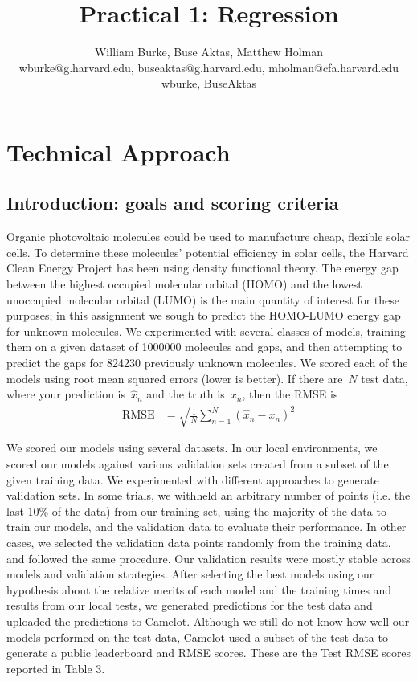 \documentclass[11pt]{article}
\title{Practical 1: Regression}
\author{William Burke, Buse Aktas, Matthew Holman \\ wburke@g.harvard.edu, buseaktas@g.harvard.edu, mholman@cfa.harvard.edu \\
wburke, BuseAktas}
\begin{document}
\maketitle{}
\section{Technical Approach}
\subsection {Introduction: goals and scoring criteria}
Organic photovoltaic molecules could be used to manufacture cheap, flexible solar cells. To determine these molecules' potential efficiency in solar cells, the Harvard Clean Energy Project has been using density functional theory. The energy gap between the highest occupied molecular orbital (HOMO) and the lowest unoccupied molecular orbital (LUMO) is the main quantity of interest for these purposes; in this assignment we sough to predict the HOMO-LUMO energy gap for unknown molecules. We experimented with several classes of models, training them on a given dataset of 1000000 molecules and gaps, and then attempting to predict the gaps for 824230 previously unknown molecules. We scored each of the models using root mean squared errors (lower is better).  If there are~$N$ test data, where your prediction is~$\hat{x}_n$ and the truth is~$x_n$, then the RMSE is 
	\begin{align*}
		\text{RMSE} &= \sqrt{\frac{1}{N}\sum_{n=1}^N (\hat{x}_n-x_n)^2}
	\end{align*}

We scored our models using several datasets. In our local environments, we scored our models against various validation sets created from a subset of the given training data. We experimented with different approaches to generate validation sets. In some trials, we withheld an arbitrary number of points (i.e. the last 10\% of the data) from our training set, using the majority of the data to train our models, and the validation data to evaluate their performance. In other cases, we selected the validation data points randomly from the training data, and followed the same procedure. Our validation results were mostly stable across models and validation strategies. After selecting the best models using our hypothesis about the relative merits of each model and the training times and results from our local tests, we generated predictions for the test data and uploaded the predictions to Camelot. Although we still do not know how well our models performed on the test data, Camelot used a subset of the test data to generate a public leaderboard and RMSE scores. These are the Test RMSE scores reported in Table 3.
\end{document}
